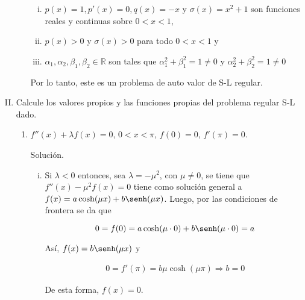 \documentclass[fleqn]{article}
\newcommand{\real}{\mathbb{R}}
\begin{document}
\begin{enumerate}[I.]
\begin{enumerate}
			\begin{enumerate}[i)]
				\item $ p(x) = 1, p'(x) = 0, q(x) = -x $ y $ \sigma(x) = x^2 + 1 $ son funciones reales y continuas sobre $ 0 < x < 1 $,
				\item $ p(x) > 0 $ y $ \sigma(x) > 0 $ para todo $ 0 < x < 1 $ y
				\item $ \alpha_1, \alpha_2, \beta_1, \beta_2 \in \real $ son tales que $ \alpha_1^2 + \beta_1^2 = 1 \neq 0 $ y $ \alpha_2^2 + \beta_2^2 = 1 \neq 0 $
			\end{enumerate}

			Por lo tanto, este es un problema de auto valor de S-L regular. 

		\end{enumerate}

		
		\bfseries \vspace{3mm}
			
		\item Calcule los valores propios y las funciones propias del problema regular S-L dado.
		
		\begin{enumerate}
			\item $ f''(x) + \lambda f(x) = 0 $, $ 0 < x < \pi $, $ f(0) = 0 $, $ f'(\pi) = 0 $.
			
			Solución.
			
			\normalfont

			\begin{enumerate}[i)]
				\item Si $ \lambda < 0 $ entonces, sea $ \lambda = - \mu^2 $, con $ \mu \neq 0 $, se tiene que $ f''(x) - \mu^2 f(x) = 0 $
				tiene como solución general a $ f(x) = a \cosh(\mu x) + b \senh(\mu x) $. Luego, por las condiciones de frontera se da que
				
				\begin{equation*}
					0 = f(0) = a \cosh(\mu \cdot 0) + b \senh(\mu \cdot 0) = a
				\end{equation*}

				Así, $ f(x) = b \senh(\mu x) $ y 

				\begin{align*}
					0 = f'(\pi) = b \mu \cosh(\mu \pi) \Longrightarrow b = 0
				\end{align*}
				
				De esta forma, $ f(x) = 0 $.


\end{enumerate}
\end{enumerate}
\end{enumerate}
\end{document}
